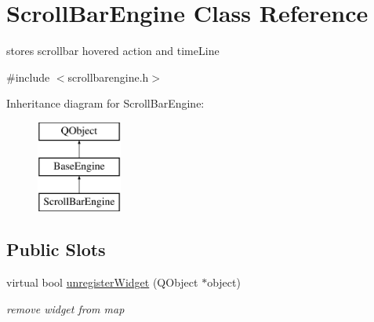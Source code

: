\hypertarget{class_scroll_bar_engine}{}\section{Scroll\+Bar\+Engine Class Reference}
\label{class_scroll_bar_engine}


stores scrollbar hovered action and time\+Line  




{\ttfamily \#include $<$scrollbarengine.\+h$>$}

Inheritance diagram for Scroll\+Bar\+Engine\+:\begin{figure}[H]
\begin{center}
\leavevmode
\includegraphics[height=3.000000cm]{class_scroll_bar_engine}
\end{center}
\end{figure}
\subsection*{Public Slots}
\begin{DoxyCompactItemize}
\item 
\mbox{\label{class_scroll_bar_engine_ac80b563a4cfe675e364621819b377e0f}} 
virtual bool \hyperlink{class_scroll_bar_engine_ac80b563a4cfe675e364621819b377e0f}{unregister\+Widget} (Q\+Object $\ast$object)
\begin{DoxyCompactList}\small\item\em remove widget from map \end{DoxyCompactList}\end{DoxyCompactItemize}
